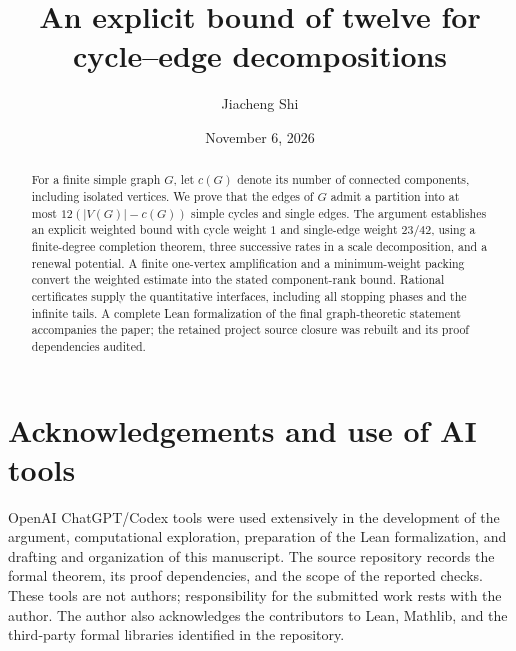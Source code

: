 \documentclass[11pt,reqno]{amsart}
\title[Cycle--edge decompositions with coefficient twelve]{An explicit bound of twelve for cycle--edge decompositions}
\author{Jiacheng Shi}
\date{November 6, 2026}
\theoremstyle{definition}
\newcommand{\abs}[1]{\left|#1\right|}
\begin{document}
\begin{abstract}
For a finite simple graph $G$, let $c(G)$ denote its number of connected
components, including isolated vertices. We prove that the edges of $G$ admit
a partition into at most $12(\abs{V(G)}-c(G))$ simple cycles and single edges.
The argument establishes an explicit weighted bound with cycle weight $1$
and single-edge weight $23/42$, using a finite-degree completion theorem,
three successive rates in a scale decomposition, and a renewal potential.
A finite one-vertex amplification and a minimum-weight packing convert the
weighted estimate into the stated component-rank bound. Rational certificates
supply the quantitative interfaces, including all stopping phases and the
infinite tails. A complete Lean formalization of the final graph-theoretic statement
accompanies the paper; the retained project source closure was rebuilt
and its proof dependencies audited.

\end{abstract}
\maketitle
\tableofcontents











\appendix






\section*{Acknowledgements and use of AI tools}
OpenAI ChatGPT/Codex tools were used extensively in the development of the
argument, computational exploration, preparation of the Lean formalization,
and drafting and organization of this manuscript. The source repository
records the formal theorem, its proof dependencies, and the scope of the
reported checks. These tools are not authors; responsibility for the submitted
work rests with the author. The author also acknowledges the contributors to
Lean, Mathlib, and the third-party formal libraries identified in the repository.
\end{document}
